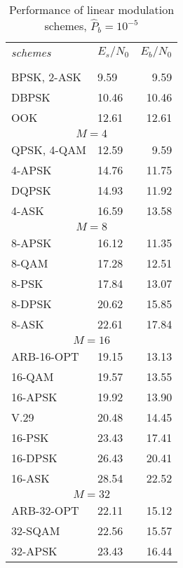 \begin{table*}
\caption{Performance of linear modulation schemes, $\hat{P}_b=10^{-5}$}
\label{tab:modem:performance}
\centering
{\footnotesize
\begin{tabular*}{0.65\textwidth}{l@{\extracolsep{\fill}}lr}
\toprule
{\it schemes} &
{\it $E_s/N_0$} &
{\it $E_b/N_0$}\\\otoprule
%
\multicolumn{3}{c}{$M=2$}\\
\midrule
BPSK, 2-ASK         &  9.59 &  9.59 \\
DBPSK               & 10.46 & 10.46 \\
OOK                 & 12.61 & 12.61 \\
%
\midrule
\multicolumn{3}{c}{$M=4$} \\
\midrule
QPSK, 4-QAM         & 12.59 &  9.59 \\
4-APSK              & 14.76 & 11.75 \\
DQPSK               & 14.93 & 11.92 \\
4-ASK               & 16.59 & 13.58 \\
%
\midrule
\multicolumn{3}{c}{$M=8$} \\\midrule
8-APSK              & 16.12 & 11.35 \\
8-QAM               & 17.28 & 12.51 \\
8-PSK               & 17.84 & 13.07 \\
8-DPSK              & 20.62 & 15.85 \\
8-ASK               & 22.61 & 17.84 \\
%
\midrule
\multicolumn{3}{c}{$M=16$} \\\midrule
ARB-16-OPT          & 19.15 & 13.13 \\
16-QAM              & 19.57 & 13.55 \\
16-APSK             & 19.92 & 13.90 \\
V.29                & 20.48 & 14.45 \\
16-PSK              & 23.43 & 17.41 \\
16-DPSK             & 26.43 & 20.41 \\
16-ASK              & 28.54 & 22.52 \\
%
\midrule
\multicolumn{3}{c}{$M=32$} \\\midrule
ARB-32-OPT          & 22.11 & 15.12 \\
32-SQAM             & 22.56 & 15.57 \\
32-APSK             & 23.43 & 16.44 \\

\end{tabular*}}
\end{table*}
